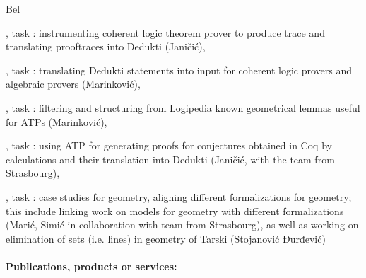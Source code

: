 \begin{sitedescription}{Bel}
  \begin{compactitem}
  \item {}, task :
    instrumenting coherent logic theorem prover to produce trace and
    translating prooftraces into Dedukti (Janičić),
  \item {}, task : translating Dedukti
    statements into input for coherent logic provers and algebraic
    provers (Marinković),
  \item {}, task : filtering and
    structuring from Logipedia known geometrical lemmas useful for
    ATPs (Marinković),
  \item {}, task : using ATP
    for generating proofs for conjectures obtained in Coq by
    calculations and their translation into Dedukti (Janičić, with the
    team from Strasbourg),
  \item {}, task
    : case studies for geometry,
    aligning different formalizations for geometry; this include
    linking work on models for geometry with different formalizations
    (Marić, Simić in collaboration with team from Strasbourg), as well
    as working on elimination of sets (i.e. lines) in geometry of
    Tarski (Stojanović Đurđević) 
  \end{compactitem}
  
  \paragraph{Publications, products or services:}


\end{sitedescription}
